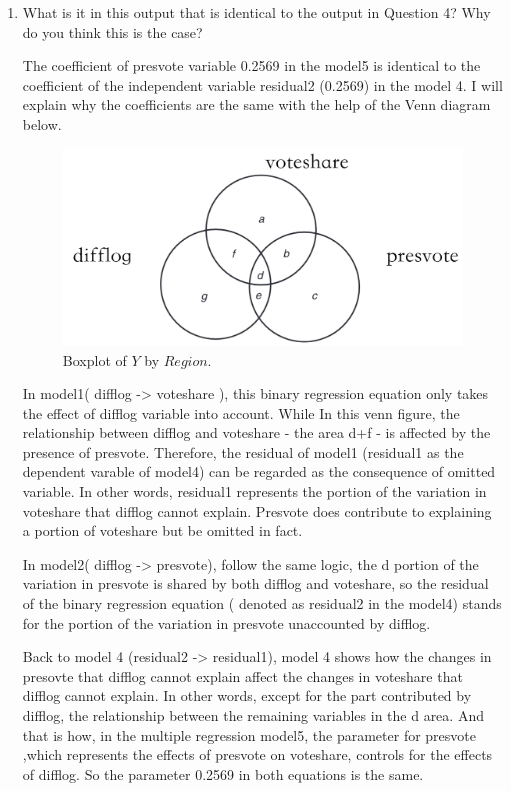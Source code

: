 \documentclass[12pt,letterpaper]{article}
\begin{document}
\begin{enumerate}
		
		
			\vspace{5cm}
		\item What is it in this output that is identical to the output in Question 4? Why do you think this is the case?
		
		\noindent The  coefficient  of presvote  variable 0.2569 in the model5 is identical to the coefficient of the independent variable residual2 (0.2569) in the model 4. I will explain why the coefficients are the same with the help of the Venn diagram below.
		
		\vspace{1cm}
					\begin{figure}[h!]\centering
			\caption{\footnotesize Boxplot of $Y$ by $Region$.}\vspace{-1cm}
			\label{fig:plot_3c}
			\includegraphics[width=.75\textwidth]{Venn Diagram.jpg}
		\end{figure}
		
		\vspace{1cm}
		
		\noindent In model1( difflog -> voteshare ), this binary regression equation only takes the effect of difflog variable into account. While In this venn figure, the relationship between difflog and voteshare - the area d+f - is affected by the presence of presvote. Therefore, the residual of model1 (residual1 as the dependent varable of model4) can be regarded as the consequence of omitted variable. In other words, residual1 represents the portion of the variation in voteshare that difflog cannot explain.  Presvote does contribute to explaining a portion of voteshare but be omitted in fact.
		
		In model2( difflog -> presvote), follow the same logic, the d portion of the variation in presvote is shared by both difflog and voteshare, so the residual of the binary regression equation ( denoted as residual2 in the model4) stands for the portion
		of the variation in presvote  unaccounted by difflog. 
		
		Back to model 4 (residual2 -> residual1), model 4 shows how the changes in presovte that difflog cannot explain affect the changes in voteshare that difflog cannot explain. In other words, except for the part contributed by difflog, the relationship between the remaining variables in the d area. And that is how, in the multiple regression model5, the parameter for presvote ,which represents the effects of presvote on voteshare, controls for the effects of difflog.  So the parameter 0.2569 in both equations is the same.
		
		
	\end{enumerate} 
	
\end{document}
